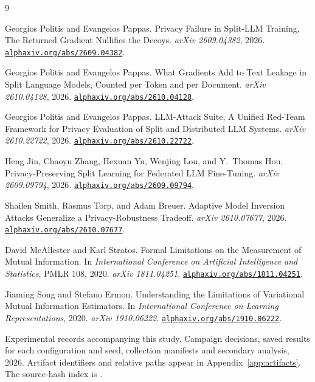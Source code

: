 \begin{thebibliography}{9}
\raggedright
{}
Georgios Politis and Evangelos Pappas.
Privacy Failure in Split-LLM Training, The Returned Gradient Nullifies the Decoys.
\emph{arXiv 2609.04382}, 2026.
\href{https://www.alphaxiv.org/abs/2609.04382}{\nolinkurl{alphaxiv.org/abs/2609.04382}}.

Georgios Politis and Evangelos Pappas.
What Gradients Add to Text Leakage in Split Language Models, Counted per Token and per Document.
\emph{arXiv 2610.04128}, 2026.
\href{https://www.alphaxiv.org/abs/2610.04128}{\nolinkurl{alphaxiv.org/abs/2610.04128}}.

Georgios Politis and Evangelos Pappas.
LLM-Attack Suite, A Unified Red-Team Framework for Privacy Evaluation of Split and Distributed LLM Systems.
\emph{arXiv 2610.22722}, 2026.
\href{https://www.alphaxiv.org/abs/2610.22722}{\nolinkurl{alphaxiv.org/abs/2610.22722}}.

Heng Jin, Chaoyu Zhang, Hexuan Yu, Wenjing Lou, and Y.\ Thomas Hou.
Privacy-Preserving Split Learning for Federated LLM Fine-Tuning.
\emph{arXiv 2609.09794}, 2026.
\href{https://www.alphaxiv.org/abs/2609.09794}{\nolinkurl{alphaxiv.org/abs/2609.09794}}.

Shailen Smith, Rasmus Torp, and Adam Breuer.
Adaptive Model Inversion Attacks Generalize a Privacy-Robustness Tradeoff.
\emph{arXiv 2610.07677}, 2026.
\href{https://www.alphaxiv.org/abs/2610.07677}{\nolinkurl{alphaxiv.org/abs/2610.07677}}.

David McAllester and Karl Stratos.
Formal Limitations on the Measurement of Mutual Information.
In \emph{International Conference on Artificial Intelligence and Statistics},
PMLR 108, 2020. \emph{arXiv 1811.04251}.
\href{https://www.alphaxiv.org/abs/1811.04251}{\nolinkurl{alphaxiv.org/abs/1811.04251}}.

Jiaming Song and Stefano Ermon.
Understanding the Limitations of Variational Mutual Information Estimators.
In \emph{International Conference on Learning Representations}, 2020.
\emph{arXiv 1910.06222}.
\href{https://www.alphaxiv.org/abs/1910.06222}{\nolinkurl{alphaxiv.org/abs/1910.06222}}.

Experimental records accompanying this study.
Campaign decisions, saved results for each configuration and seed, collection
manifests and secondary analysis, 2026.
Artifact identifiers and relative paths appear in Appendix~\ref{app:artifacts}.
The source-hash index is .
\end{thebibliography}
